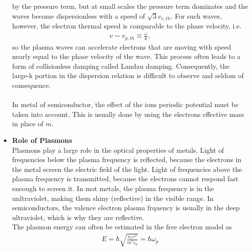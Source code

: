 \begin{itemize}
by the pressure term, but at small scales the pressure term dominates and 
the waves become dispersionless with a speed of $\sqrt{3}v_{e,th}$. For such waves, however, the
electron thermal speed is comparable to the phase velocity, i.e.
\begin{align}
v \sim v_{p,th} \equiv \frac{\omega}{k},
\end{align}
so the plasma waves can accelerate electrons that are moving with speed nearly equal to the
phase velocity of the wave. This process often leads to a form of collisionless damping
called Landau damping. Consequently, the large-k portion in the dispersion relation is difficult to
observe and seldom of consequence.
\\
\\
In metal of semiconductor, the effect of the ions periodic potential must be taken into account. This is
usually done by using the electrons effective mass in place of $m$.

\item \textbf{Role of Plasmons} \\
Plasmons play a large role in the optical properties of metals. Light of frequencies below the
plasma frequency is reflected, because the electrons in the metal screen the electric field 
of the light. Light of frequencies above the plasma frequency is transmitted, because the
electrons cannot respond fast eneough to screen it. In mot metals, the plasma frequency is in the 
unltraviolet, making them shiny (reflective) in the visible range. 
In semiconductors, the valence electron plasma frquency is usually in the deep ultraviolet, which is why
they are reflective.
\\
The plasmon energy can often be estimated in the free electron model as
\begin{align}
   E = \hbar \sqrt{\frac{n_e e^2}{m^* \varepsilon_0}} = \hbar \omega_p
\end{align}





\end{itemize}
